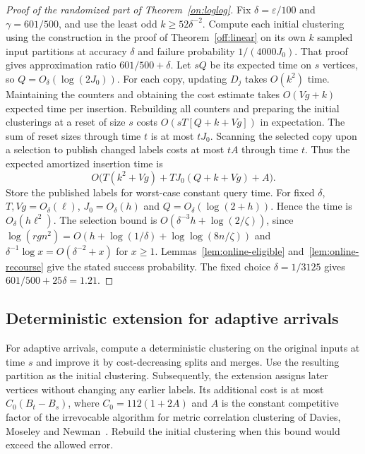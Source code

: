 \documentclass[11pt]{article}
\begin{document}
\begin{proof}[Proof of the randomized part of Theorem~\ref{on:loglog}]
Fix $\delta=\varepsilon/100$ and $\gamma=601/500$, and use the least
odd $k\ge52\delta^{-2}$. Compute each initial clustering using the construction in the proof of
Theorem~\ref{off:linear} on its own $k$ sampled input partitions at accuracy $\delta$
and failure probability $1/(4000J_0)$. That proof gives approximation
ratio $601/500+\delta$.
Let $sQ$ be its expected time on $s$ vertices, so
$Q=O_\delta(\log(2J_0))$. For each copy, updating $D_j$
takes $O(k^2)$ time. Maintaining the counters and obtaining the cost
estimate takes $O(Vg+k)$ expected time per insertion.
Rebuilding all counters and preparing the initial clusterings at a reset
of size $s$ costs $O(sT[Q+k+Vg])$ in expectation. The sum of reset
sizes through time $t$ is at most $tJ_0$. Scanning the selected
copy upon a selection to publish changed labels costs at most $tA$
through time $t$. Thus the expected amortized insertion time is
\[
 O\bigl(T(k^2+Vg)+TJ_0(Q+k+Vg)+A\bigr).
\]
Store the published labels for worst-case constant query time.
For fixed $\delta$, $T,Vg=O_\delta(\ell)$, $J_0=O_\delta(h)$ and
$Q=O_\delta(\log(2+h))$. Hence the time is $O_\delta(h\ell^2)$.
The selection bound is $O(\delta^{-3}h+\log(2/\zeta))$, since
$\log(rgn^2)=O(h+\log(1/\delta)+\log\log(8n/\zeta))$ and
$\delta^{-1}\log x=O(\delta^{-2}+x)$ for $x\ge1$.
Lemmas~\ref{lem:online-eligible} and~\ref{lem:online-recourse}
give the stated success probability. The fixed choice $\delta=1/3125$ gives
$601/500+25\delta=1.21$.
\end{proof}

\subsection{Deterministic extension for adaptive arrivals}
\label{det:section}

For adaptive arrivals, compute a deterministic clustering on the original
inputs at time $s$ and improve it by cost-decreasing splits and merges.
Use the resulting partition as the initial clustering. Subsequently,
the extension assigns later vertices without changing any earlier
labels. Its additional cost is at most $C_0(B_t-B_s)$, where
$C_0=112(1+2A)$ and $A$ is the constant competitive factor of the
irrevocable algorithm for metric correlation clustering of Davies,
Moseley and Newman~\cite{DMN2026}. Rebuild the initial clustering when this bound
would exceed the allowed error.
\end{document}
